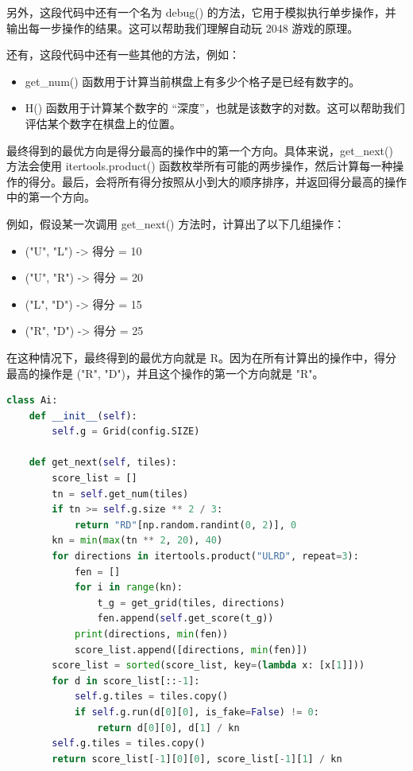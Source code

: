 \documentclass[UTF8,AutoFakeBold,AutoFakeSlant,zihao=-4]{ctexart}
\begin{document}
另外，这段代码中还有一个名为 debug() 的方法，它用于模拟执行单步操作，并输出每一步操作的结果。这可以帮助我们理解自动玩 2048 游戏的原理。

还有，这段代码中还有一些其他的方法，例如：

\begin{itemize}
  \item get\_num() 函数用于计算当前棋盘上有多少个格子是已经有数字的。
  \item H() 函数用于计算某个数字的 “深度”，也就是该数字的对数。这可以帮助我们评估某个数字在棋盘上的位置。
\end{itemize}

最终得到的最优方向是得分最高的操作中的第一个方向。具体来说，get\_next() 方法会使用 itertools.product() 函数枚举所有可能的两步操作，然后计算每一种操作的得分。最后，会将所有得分按照从小到大的顺序排序，并返回得分最高的操作中的第一个方向。

例如，假设某一次调用 get\_next() 方法时，计算出了以下几组操作：

\begin{itemize}
  \item ("U", "L") -> 得分 = 10
  \item ("U", "R") -> 得分 = 20
  \item ("L", "D") -> 得分 = 15
  \item ("R", "D") -> 得分 = 25
\end{itemize}

在这种情况下，最终得到的最优方向就是 R。因为在所有计算出的操作中，得分最高的操作是 ("R", "D")，并且这个操作的第一个方向就是 "R"。

\begin{lstlisting}[language=Python]
  class Ai:
    def __init__(self):
        self.g = Grid(config.SIZE)

    def get_next(self, tiles):
        score_list = []
        tn = self.get_num(tiles)
        if tn >= self.g.size ** 2 / 3:
            return "RD"[np.random.randint(0, 2)], 0
        kn = min(max(tn ** 2, 20), 40)
        for directions in itertools.product("ULRD", repeat=3):
            fen = []
            for i in range(kn):
                t_g = get_grid(tiles, directions)
                fen.append(self.get_score(t_g))
            print(directions, min(fen))
            score_list.append([directions, min(fen)])
        score_list = sorted(score_list, key=(lambda x: [x[1]]))
        for d in score_list[::-1]:
            self.g.tiles = tiles.copy()
            if self.g.run(d[0][0], is_fake=False) != 0:
                return d[0][0], d[1] / kn
        self.g.tiles = tiles.copy()
        return score_list[-1][0][0], score_list[-1][1] / kn
\end{lstlisting}
\end{document}
